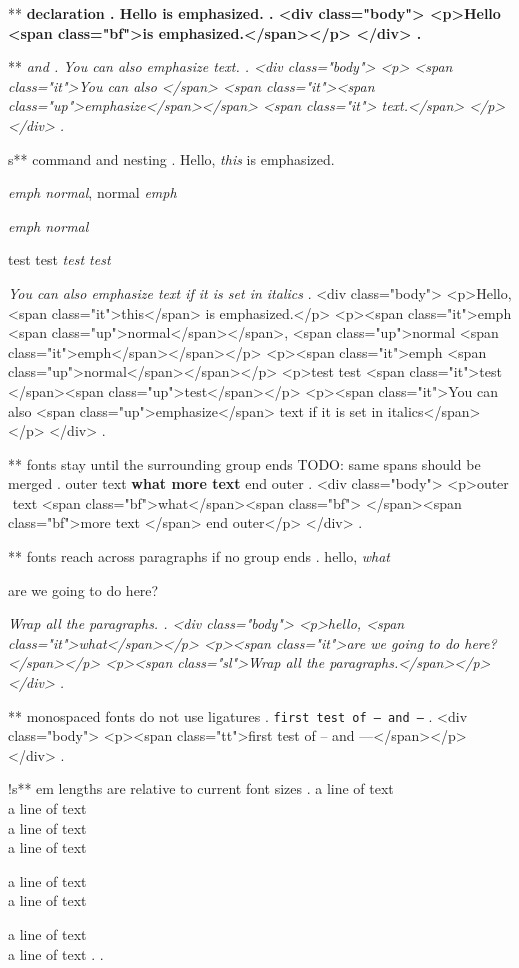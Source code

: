 ** \bfseries declaration
.
Hello \bfseries is emphasized.
.
<div class="body">
<p>Hello <span class="bf">is emphasized.</span></p>
</div>
.


** \em and \emph{}
.
\em You can also \emph{emphasize} text.
.
<div class="body">
<p>
<span class="it">You can also </span>
<span class="it"><span class="up">emphasize</span></span>
<span class="it"> text.</span>
</p>
</div>
.


s** \emph{} command and nesting
.
Hello, \emph{this} is emphasized.

\emph{emph \textup{normal}}, \textup{normal \emph{emph}}

\emph{emph \emph{normal}}

test {test \em\em\em test \em test}

\textit{You can also \emph{emphasize} text if it is set in italics}
.
<div class="body">
<p>Hello, <span class="it">this</span> is emphasized.</p>
<p><span class="it">emph <span class="up">normal</span></span>, <span class="up">normal <span class="it">emph</span></span></p>
<p><span class="it">emph <span class="up">normal</span></span></p>
<p>test test <span class="it">test </span><span class="up">test</span></p>
<p><span class="it">You can also <span class="up">emphasize</span> text if it is set in italics</span></p>
</div>
.


** fonts stay until the surrounding group ends      TODO: same spans should be merged
.
outer { text \bfseries {what} more text } end outer
.
<div class="body">
<p>outer ​ text <span class="bf">what</span><span class="bf">​ </span><span class="bf">more text </span>​ end outer</p>
</div>
.


** fonts reach across paragraphs if no group ends
.
hello, \itshape what

are we going to do here?

\slshape
Wrap all the paragraphs.
.
<div class="body">
<p>hello, <span class="it">what</span></p>
<p><span class="it">are we going to do here?</span></p>
<p><span class="sl">Wrap all the paragraphs.</span></p>
</div>
.


** monospaced fonts do not use ligatures
.
\texttt{first test of -- and ---}
.
<div class="body">
<p><span class="tt">first test of -- and ---</span></p>
</div>
.



!s** em lengths are relative to current font sizes
.
\small
a line of text\\[1em]
a line of text\\[1em]
\Huge
a line of text\\[1em]
a line of text

\small
a line of text\\[1em]
a line of text

\Huge
a line of text\\[1em]
a line of text
.
.
